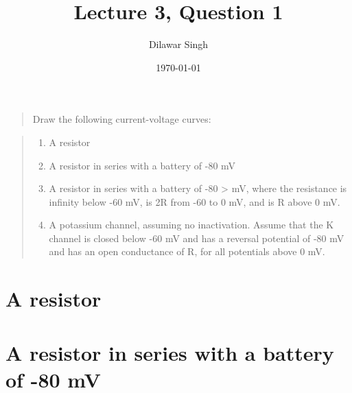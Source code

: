 \documentclass[]{article}
\title{Lecture 3, Question 1}
\author{Dilawar Singh}
\date{\today}
\begin{document}
\maketitle

\begin{quote}
Draw the following current-voltage curves:
\end{quote}

\begin{quote}
\begin{enumerate}
\def\labelenumi{\alph{enumi}.}
\itemsep1pt\parskip0pt
\item
  A resistor
\item
  A resistor in series with a battery of -80 mV
\item
  A resistor in series with a battery of -80 \textgreater{} mV, where
  the resistance is infinity below -60 mV, is 2R from -60 to 0 mV, and
  is R above 0 mV.\\
\item
  A potassium channel, assuming no inactivation. Assume that the K
  channel is closed below -60 mV and has a reversal potential of -80 mV
  and has an open conductance of R, for all potentials above 0 mV.
\end{enumerate}
\end{quote}

\section{A resistor}\label{a-resistor}

\begin{figure}[!ht]
\begin{center}
\end{center}
\end{figure}

\section{A resistor in series with a battery of -80
mV}\label{a-resistor-in-series-with-a-battery-of--80-mv}
\end{document}
